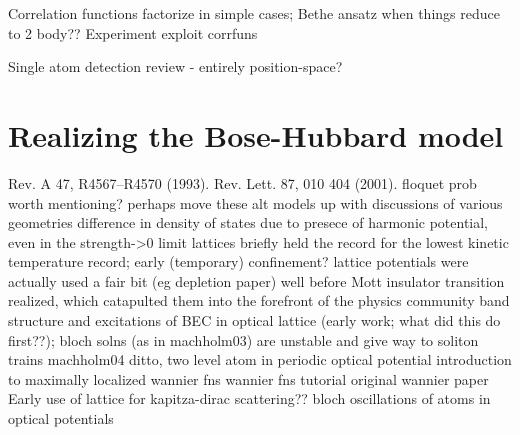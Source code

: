 		Correlation functions factorize in simple cases; Bethe ansatz when things reduce to 2 body??
		Experiment exploit corrfuns 
			\cite{schweigler17}
			\cite{hodgman17}

			Single atom detection
	\cite{ott16} review - entirely position-space?


\section{Realizing the Bose-Hubbard model}
	\cite{grimm00}%
	\cite{miller93}%
	Rev.
	A 47, R4567–R4570 (1993).
	\cite{barrett01}%
	Rev.
	Lett.
	87, 010 404 (2001).
	\cite{cabrera}%
	\cite{celi14}%
	\cite{gadway18}%
	\cite{ghose03}%
	floquet prob worth mentioning?
		perhaps move these alt models up with discussions of various geometries 
	\cite{hooley04}
		difference in density of states due to presece of harmonic potential, even in the strength->0 limit
	\cite{kastberg95}
		lattices briefly held the record for the lowest kinetic temperature record; early (temporary) confinement?
		lattice potentials were actually used a fair bit (eg depletion paper) well before Mott insulator transition realized, which catapulted them into the forefront of the physics community
	\cite{machholm03}
		band structure and excitations of BEC in optical lattice (early work; what did this do first??);
		bloch solns (as in machholm03) are unstable and give way to soliton trains machholm04
	ditto, two level atom in periodic optical potential
		\cite{wilkens91}
	introduction to maximally localized wannier fns
		\cite{marzari00}
	\cite{pavarini11}
		wannier fns tutorial
	original wannier paper
		\cite{wannier37}
	\cite{peik97}
		Early use of lattice for kapitza-dirac scattering?? bloch oscillations of atoms in optical potentials



